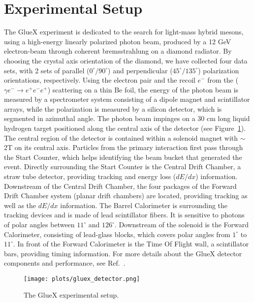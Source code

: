 \documentclass[a4paper]{jpconf}
\begin{document}
\section{Experimental Setup}
The GlueX experiment is dedicated to the search for light-mass hybrid mesons, using a high-energy linearly polarized photon beam, produced by a 12 GeV electron-beam through coherent bremsstrahlung on a diamond radiator. By choosing the crystal axis orientation of the diamond, we have collected four data sets, with 2 sets of parallel ($0^{\circ}/90^{\circ}$) and perpendicular ($45^{\circ}/135^{\circ}$) polarization orientations, respectively. Using the electron pair and the recoil $e^{-}$ from the ($\gamma e^{-} \rightarrow e^{+}e^{-}e^{+}$) scattering on a thin Be foil, the energy of the photon beam is measured by a spectrometer system consisting of a dipole magnet and scintillator arrays, while the polarization is measured by a silicon detector, which is segmented in azimuthal angle. The photon beam impinges on a 30 cm long liquid hydrogen target positioned along the central axis of the detector (see Figure~\ref{fig.1}). The central region of the detector is contained within a solenoid magnet with $\sim$ 2T on its central axis. Particles from the primary interaction first pass through the Start Counter, which helps identifying the beam bucket that generated the event. Directly surrounding the Start Counter is the Central Drift Chamber, a straw tube detector, providing tracking and energy loss ($dE/dx$) information. Downstream of the Central Drift Chamber, the four packages of the Forward Drift Chamber system (planar drift chambers) are located, providing tracking as well as the $dE/dx$ information. The Barrel Calorimeter is surrounding the tracking devices and is made of lead scintillator fibers. It is sensitive to photons of polar angles between $11^{\circ}$ and $126^{\circ}$. Downstream of the solenoid is the Forward Calorimeter, consisting of lead-glass blocks, which covers polar angles from $1^{\circ}$ to $11^{\circ}$. In front of the Forward Calorimeter is the Time Of Flight wall, a scintillator bars, providing timing information. For more details about the GlueX detector components and performance, see Ref.~\cite{ref.3}.

\begin{figure}[h]
    \centering
    \texttt{[image: plots/gluex\_detector.png]}
    \caption{\label{fig.1}The GlueX experimental setup.}
\end{figure}
\end{document}
